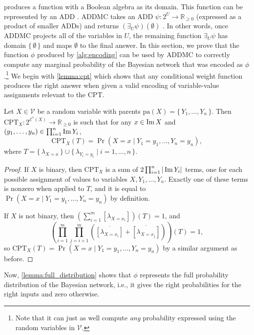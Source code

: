  produces a function with a Boolean algebra as its domain.
This function can be represented by an ADD
\citep{DBLP:journals/fmsd/BaharFGHMPS97}. \textsc{ADDMC} takes an ADD
$\psi\colon 2^{U} \to \mathbb{R}_{\ge 0}$ (expressed as a product of smaller
ADDs) and returns $(\exists_U\psi)(\emptyset)$ \citep{DBLP:conf/aaai/DudekPV20}.
In other words, once \textsc{ADDMC} projects all of the variables in $U$, the
remaining function $\exists_{U}\psi$ has domain $\{\,\emptyset\,\}$ and maps
$\emptyset$ to the final answer. In this section, we prove that the function
$\phi$ produced by \cref{alg:encoding} can be used by \textsc{ADDMC} to
correctly compute any marginal probability of the Bayesian network that was
encoded as $\phi$.\footnote{Note that it can just as well compute \emph{any}
  probability expressed using the random variables in $\mathcal{V}$.} We begin
with \cref{lemma:cpt} which shows that any conditional weight function produces
the right answer when given a valid encoding of variable-value assignments
relevant to the CPT\@.

\begin{lemma}\label{lemma:cpt}
  Let $X \in \mathcal{V}$ be a random variable with parents
  $\mathrm{pa}(X) = \{\, Y_1, \dots, Y_n \,\}$. Then
  $\mathrm{CPT}_X\colon 2^{\mathcal{E}^*(X)} \to \mathbb{R}_{\ge 0}$ is such
  that for any $x \in \operatorname{Im} X$ and
  $(y_1, \dots, y_n) \in \prod_{i=1}^n \operatorname{Im} Y_i$,
  \[
    \mathrm{CPT}_X (T) = \Pr(X = x \mid Y_1 = y_1, \dots, Y_n = y_n),
  \]
  where
  $T = \{\, \lambda_{X=x} \,\} \cup \{\, \lambda_{Y_i=y_i} \mid i = 1, \dots, n \,\}$.
\end{lemma}
\begin{proof}
  If $X$ is binary, then $\mathrm{CPT}_X$ is a sum of
  $2\prod_{i=1}^n |\operatorname{Im} Y_i|$ terms, one for each possible assignment of values
  to variables $X, Y_1, \dots, Y_n$. Exactly one of these terms is nonzero when
  applied to $T$, and it is equal to
  $\Pr(X = x \mid Y_1 = y_1, \dots, Y_n = y_n)$ by definition.

  If $X$ is not binary, then
  $\left( \sum_{i=1}^m [\lambda_{X = x_i}] \right)(T) = 1$, and
  \[
    \left( \prod_{i=1}^m \prod_{j=i+1}^m (\overline{[\lambda_{X = x_i}]} + \overline{[\lambda_{X = x_j}]}) \right)(T) = 1,
  \]
  so $\mathrm{CPT}_X(T) = \Pr(X = x \mid Y_1 = y_1, \dots, Y_n = y_n)$ by a
  similar argument as before.
\end{proof}

Now, \cref{lemma:full_distribution} shows that $\phi$ represents the full
probability distribution of the Bayesian network, i.e., it gives the right
probabilities for the right inputs and zero otherwise. 


